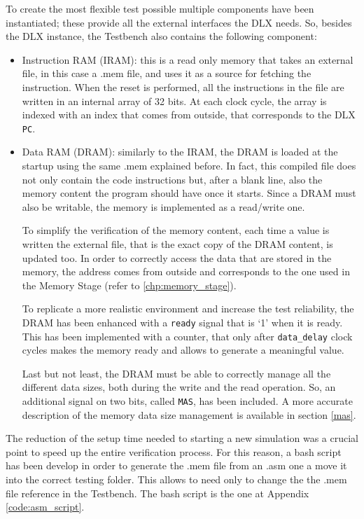 To create the most flexible test possible multiple components have been instantiated; these provide all the external interfaces the DLX needs. So, besides the DLX instance, the Testbench also contains the following component:
\begin{itemize} 
	\item Instruction RAM (IRAM): this is a read only memory that takes an external file, in this case a .mem file, and uses it as a source for fetching the instruction. When the reset is performed, all the instructions in the file are written in an internal array of 32 bits. At each clock cycle, the array is indexed with an index that comes from outside, that corresponds to the DLX \texttt{PC}.
	\item Data RAM (DRAM): similarly to the IRAM, the DRAM is loaded at the startup using the same .mem explained before. In fact, this compiled file does not only contain the code instructions but, after a blank line, also the memory content the program should have once it starts. Since a DRAM must also be writable, the memory is implemented as a read/write one. 
	
	To simplify the verification of the memory content, each time a value is written the external file, that is the exact copy of the DRAM content, is updated too.
	In order to correctly access the data that are stored in the memory, the address comes from outside and corresponds to the one used in the Memory Stage (refer to \ref{chp:memory_stage}).
	
	To replicate a more realistic environment and increase the test reliability, the DRAM has been enhanced with a \texttt{ready} signal that is `1' when it is ready. This has been implemented with a counter, that only after \texttt{data\_delay} clock cycles makes the memory ready and allows to generate a meaningful value.
	
	Last but not least, the DRAM must be able to correctly manage all the different data sizes, both during the write and the read operation. So, an additional signal on two bits, called \texttt{MAS}, has been included. A more accurate description of the memory data size management is available in section \ref{mas}.
\end{itemize}

The reduction of the setup time needed to starting a new simulation was a crucial point to speed up the entire verification process. For this reason, a bash script has been develop in order to generate the .mem file from an .asm one a move it into the correct testing folder. This allows to need only to change the the .mem file reference in the Testbench. The bash script is the one at Appendix \ref{code:asm_script}.



